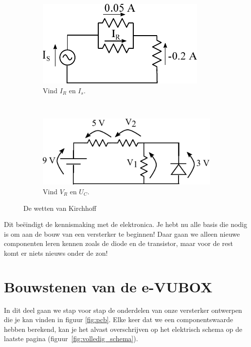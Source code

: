 \documentclass{article}
\begin{document}
			\begin{figure}[htbp]
				\centering
				\begin{subfigure}[b]{0.45\linewidth}
					\centering
					\includegraphics{kcl_oef.pdf}
					\caption{Vind $I_R$ en $I_s$.}
					\label{subfig:kcl_oef}
				\end{subfigure}
				~
				\begin{subfigure}[b]{0.45\linewidth}
					\centering
					\includegraphics[width=\linewidth]{kvl_oef.pdf}
					\caption{Vind $V_R$ en $U_C$. }
					\label{subfig:kvl_oef}
				\end{subfigure}
			\caption{De wetten van Kirchhoff}
			\label{fig:kirchoff_oef}
			\end{figure}

			Dit be\"eindigt de kennismaking met de elektronica. Je hebt nu alle basis die nodig is om aan de bouw van een versterker te beginnen! Daar gaan we alleen nieuwe componenten leren kennen zoals de diode en de transistor, maar voor de rest komt er niets nieuws onder de zon!

	\section{Bouwstenen van de e-VUBOX}
	\label{sec:bouwstenen}
		In dit deel gaan we stap voor stap de onderdelen van onze versterker ontwerpen die je kan vinden in  figuur \ref{fig:pcb}. Elke keer dat we een componentswaarde hebben berekend, kan je het alvast overschrijven op het elektrisch schema op de laatste pagina (figuur~\ref{fig:volledig_schema}). 
\end{document}
